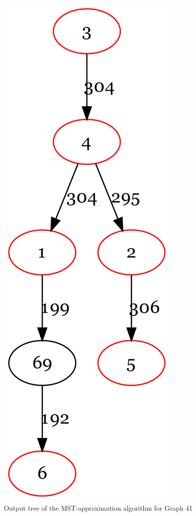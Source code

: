 \begin{figure}[htbp]
\centering
\includegraphics[scale=0.15]{figures/MST.png}
\caption{Output tree of the MST-approximation algorithm for Graph 41}\label{fig:MSTTree41}
\end{figure}

